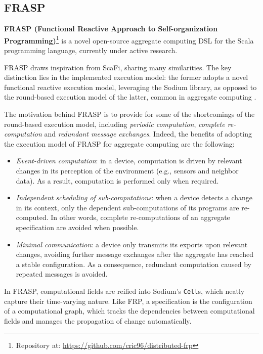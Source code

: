 
\subsection{FRASP}
\label{section:background:technologies:frasp}

\textbf{FRASP (Functional Reactive Approach to Self-organization Programming)}\footnote{Repository at: \url{https://github.com/cric96/distributed-frp}}
is a novel open-source aggregate computing \ac{DSL} for the Scala programming
language, currently under active research.

FRASP draws inspiration from \ac{ScaFi}, sharing many similarities. The key
distinction lies in the implemented execution model: the former adopts a novel
functional reactive execution model, leveraging the Sodium library, as opposed
to the round-based execution model of the latter, common in aggregate computing
\cite{FRASP}.

The motivation behind FRASP is to provide for some of the shortcomings of the
round-based execution model, including \textit{periodic computation},
\textit{complete re-computation} and \textit{redundant message exchanges}.
Indeed, the benefits of adopting the execution model of FRASP for aggregate
computing are the following:
\begin{itemize}
  \item \textit{Event-driven computation}: in a device, computation is driven
        by relevant changes in its perception of the environment (e.g.,
        sensors and neighbor data). As a result, computation is performed
        only when required.
  \item \textit{Independent scheduling of sub-computations}: when a device
        detects a change in its context, only the dependent sub-computations
        of its programs are re-computed. In other words, complete
        re-computations of an aggregate specification are avoided when possible.
  \item \textit{Minimal communication}: a device only transmits its exports
        upon relevant changes, avoiding further message exchanges after the
        aggregate has reached a stable configuration. As a consequence, redundant
        computation caused by repeated messages is avoided.
\end{itemize}

In FRASP, computational fields are reified into Sodium's \texttt{Cell}s, which
neatly capture their time-varying nature. Like \ac{FRP}, a specification is the
configuration of a computational graph, which tracks the dependencies between
computational fields and manages the propagation of change automatically.


